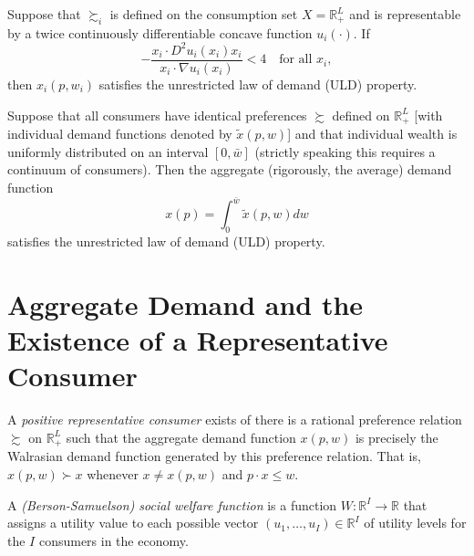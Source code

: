 \begin{prop}
    Suppose that $\succsim_i$ is defined on the consumption set $X = \mathbb{R}^L_+$ and is representable by a twice continuously differentiable concave function $u_i(\cdot)$. If 
    \begin{equation*}
        - \frac{x_i \cdot D^2 u_i(x_i) x_i}{x_i \cdot \nabla u_i(x_i)} < 4 \quad \text{for all } x_i,
    \end{equation*}
    then $x_i(p, w_i)$ satisfies the unrestricted law of demand (ULD) property.
\end{prop}

\begin{prop}
    Suppose that all consumers have identical preferences $\succsim$ defined on $\mathbb{R}^{L}_+$ [with individual demand functions denoted by $\tilde{x}(p, w)$] and that individual wealth is uniformly distributed on an interval $[0, \bar{w}]$ (strictly speaking this requires a continuum of consumers). Then the aggregate (rigorously, the average) demand function
    \begin{equation*}
        x(p) = \int_0^{\bar{w}} \tilde{x}(p, w) dw
    \end{equation*}
    satisfies the unrestricted law of demand (ULD) property.
\end{prop}


\section{Aggregate Demand and the Existence of a Representative Consumer}

\begin{defn}
    A \emph{positive representative consumer} exists of there is a rational preference relation $\succsim$ on $\mathbb{R}^{L}_+$ such that the aggregate demand function $x(p, w)$ is precisely the Walrasian demand function generated by this preference relation. That is, $x(p, w) \succ x$ whenever $x \neq x(p, w)$ and $p \cdot x \leq w$.
\end{defn}

\begin{defn}
    A \emph{(Berson-Samuelson) social welfare function} is a function $W: \mathbb{R}^{I} \rightarrow \mathbb{R}$ that assigns a utility value to each possible vector $(u_1, \dots, u_I) \in \mathbb{R}^{I}$ of utility levels for the $I$ consumers in the economy.
\end{defn}

